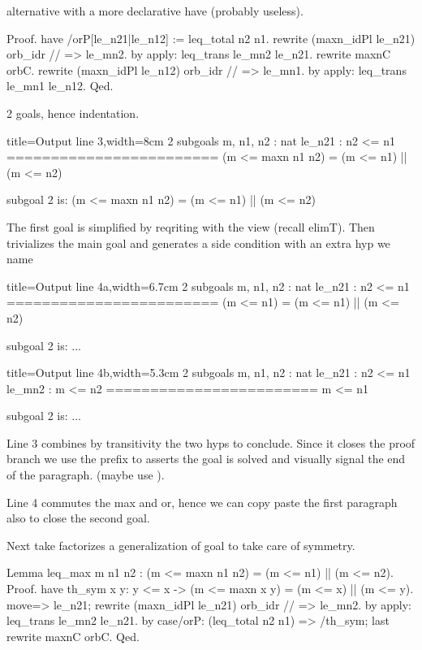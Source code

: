 alternative with a more declarative have (probably useless).

\begin{coq}{}{}
Proof.
have /orP[le_n21|le_n12] := leq_total n2 n1.
  rewrite (maxn_idPl le_n21) orb_idr // => le_mn2.
  by apply: leq_trans le_mn2 le_n21.
rewrite maxnC orbC.
rewrite (maxn_idPl le_n12) orb_idr // => le_mn1.
by apply: leq_trans le_mn1 le_n12.
Qed.
\end{coq}


2 goals, hence indentation.

\begin{coqout}{}{title=Output line 3,width=8cm}
2 subgoals
m, n1, n2 : nat
le_n21 : n2 <= n1
========================
(m <= maxn n1 n2) = (m <= n1) || (m <= n2)

subgoal 2 is:
(m <= maxn n1 n2) = (m <= n1) || (m <= n2)
\end{coqout}

The first goal is simplified by
reqriting with the  view (recall elimT).  Then
 trivializes the main goal and generates a side condition
with an extra hyp we name 

\begin{coqout}{}{title=Output line 4a,width=6.7cm}
2 subgoals
m, n1, n2 : nat
le_n21 : n2 <= n1
========================
(m <= n1) = (m <= n1) || (m <= n2)

subgoal 2 is: ...
\end{coqout}
\begin{coqout}{}{title=Output line 4b,width=5.3cm}
2 subgoals
m, n1, n2 : nat
le_n21 : n2 <= n1
le_mn2 : m <= n2
========================
m <= n1

subgoal 2 is: ...
\end{coqout}

Line 3 combines by transitivity the two hyps to conclude.
Since it closes the proof branch we use the prefix 
to asserts the goal is solved and visually signal the end of the paragraph.
(maybe use ).

Line 4 commutes the max and or, hence we can copy paste the first paragraph
also to close the second goal.

Next take factorizes a generalization of goal to take care of symmetry.

\begin{coq}{}{}
Lemma leq_max m n1 n2 : (m <= maxn n1 n2) = (m <= n1) || (m <= n2).
Proof.
have th_sym x y: y <= x -> (m <= maxn x y) = (m <= x) || (m <= y).
  move=> le_n21; rewrite (maxn_idPl le_n21) orb_idr // => le_mn2.
  by apply: leq_trans le_mn2 le_n21.
by case/orP: (leq_total n2 n1) => /th_sym; last rewrite maxnC orbC.
Qed.
\end{coq}


